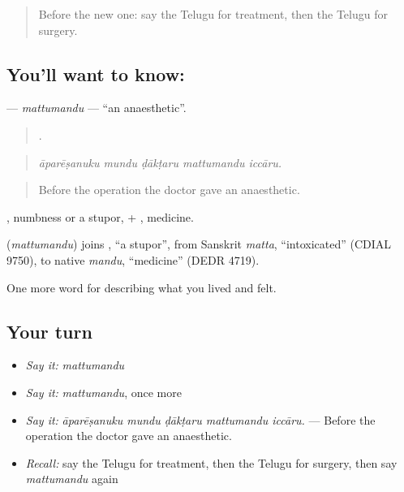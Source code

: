 \label{lesson:TE-C519-mattumandu}



\begin{quote}
Before the new one: say the Telugu for treatment, then the Telugu for surgery.
\end{quote}

\subsection*{You'll want to know: }
\textbf{} — \emph{mattumandu} — \textquotedblleft{}an anaesthetic\textquotedblright{}.

\begin{quote}
    .
\end{quote}

\begin{quote}
\emph{āparēṣanuku mundu ḍākṭaru mattumandu iccāru.}
\end{quote}

\begin{quote}
Before the operation the doctor gave an anaesthetic.
\end{quote}

, numbness or a stupor, + , medicine.

\begin{cousinweb}
\textbf{} (\emph{mattumandu}) joins , \textquotedblleft{}a stupor\textquotedblright{}, from Sanskrit \emph{matta}, \textquotedblleft{}intoxicated\textquotedblright{} (CDIAL 9750), to native \emph{mandu}, \textquotedblleft{}medicine\textquotedblright{} (DEDR 4719).
\end{cousinweb}

\begin{grammarlens}[title={What you've built}]
One more word for describing what you lived and felt.
\end{grammarlens}

\subsection*{Your turn}
\begin{itemize}
\raggedright
  \item \emph{Say it:} \emph{mattumandu}
  \item \emph{Say it:} \emph{mattumandu}, once more
  \item \emph{Say it:} \emph{āparēṣanuku mundu ḍākṭaru mattumandu iccāru.} — Before the operation the doctor gave an anaesthetic.
  \item \emph{Recall:} say the Telugu for treatment, then the Telugu for surgery, then say \emph{mattumandu} again
\end{itemize}

